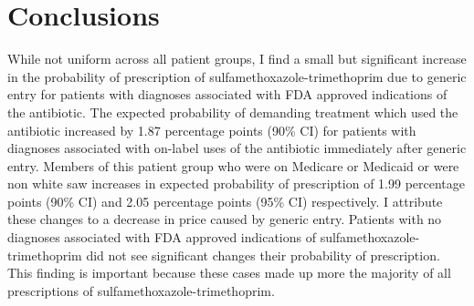 \chapter{Conclusions}
\indent While not uniform across all patient groups, I find a small but significant increase in the probability of prescription of sulfamethoxazole-trimethoprim due to generic entry for patients with diagnoses associated with FDA approved indications of the antibiotic. The expected probability of demanding treatment which used the antibiotic increased by 1.87 percentage points (90\% CI) for patients with diagnoses associated with on-label uses of the antibiotic immediately after generic entry. Members of this patient group who were on Medicare or Medicaid or were non white saw increases in expected probability of prescription of 1.99 percentage points (90\% CI) and 2.05 percentage points (95\% CI) respectively. I attribute these changes to a decrease in price caused by generic entry. Patients with no diagnoses associated with FDA approved indications of sulfamethoxazole-trimethoprim did not see significant changes their probability of prescription. This finding is important because these cases made up more the majority of all prescriptions of sulfamethoxazole-trimethoprim.

